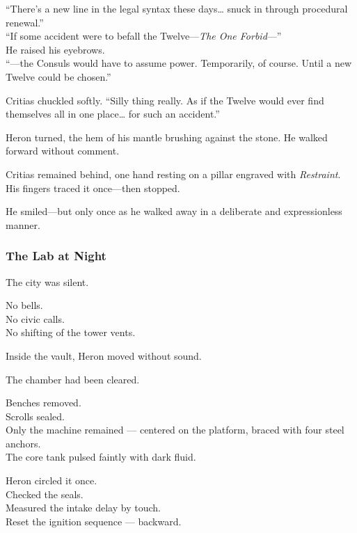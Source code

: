 \documentclass[12pt]{article}
\begin{document}
“There’s a new line in the legal syntax these days… snuck in through procedural renewal.”\\
“If some accident were to befall the Twelve—\textit{The One Forbid}—” \\
He raised his eyebrows.\\
“—the Consuls would have to assume power. Temporarily, of course. Until a new Twelve could be chosen.”

Critias chuckled softly.  
“Silly thing really. As if the Twelve would ever find themselves all in one place… for such an accident.”

\vspace{1em}

Heron turned, the hem of his mantle brushing against the stone.  
He walked forward without comment.

Critias remained behind, one hand resting on a pillar engraved with \textit{Restraint}.\\
His fingers traced it once—then stopped.

\vspace{1em}

He smiled—but only once as he walked away in a deliberate and expressionless manner.

\dotfill

\subsubsection*{The Lab at Night}

The city was silent.

No bells.\\
No civic calls.\\
No shifting of the tower vents.

Inside the vault, Heron moved without sound.

\vspace{1em}

The chamber had been cleared.

Benches removed.\\
Scrolls sealed.\\
Only the machine remained — centered on the platform, braced with four steel anchors.\\
The core tank pulsed faintly with dark fluid.

Heron circled it once.\\
Checked the seals.\\
Measured the intake delay by touch.\\
Reset the ignition sequence — backward.
\end{document}
